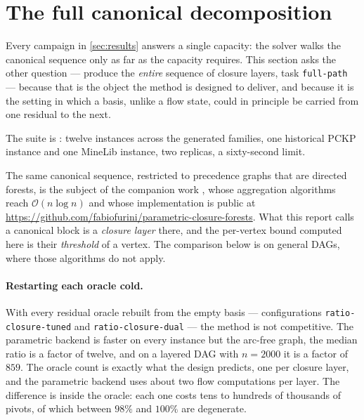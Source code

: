 \section{The full canonical decomposition}\label{sec:canonical}

Every campaign in \cref{sec:results} answers a single capacity: the solver walks
the canonical sequence only as far as the capacity requires. This section asks
the other question --- produce the \emph{entire} sequence of closure layers,
task \texttt{full-path} --- because that is the object the method is designed to
deliver, and because it is the setting in which a basis, unlike a flow state,
could in principle be carried from one residual to the next.

The suite is : twelve instances across
the generated families, one historical PCKP instance and one MineLib instance,
two replicas, a sixty-second limit.

The same canonical sequence, restricted to precedence graphs that are directed
forests, is the subject of the companion work \citep{DoseEtAl2026}, whose
aggregation algorithms reach $\mathcal{O}(n\log n)$ and whose implementation is
public at \url{https://github.com/fabiofurini/parametric-closure-forests}. What
this report calls a canonical block is a \emph{closure layer} there, and the
per-vertex bound computed here is their \emph{threshold} of a vertex. The
comparison below is on general DAGs, where those algorithms do not apply.



\paragraph{Restarting each oracle cold.} With every residual oracle rebuilt
from the empty basis --- configurations \texttt{ratio-closure-tuned} and
\texttt{ratio-closure-dual} --- the method is not competitive. The parametric
backend is faster on every instance but the arc-free graph, the median ratio is
a factor of twelve, and on a layered DAG with $n = 2000$ it is a factor of
$859$. The oracle count is exactly what the design predicts, one per closure
layer, and the parametric backend uses about two flow computations per layer.
The difference is inside the oracle: each one costs tens to hundreds of
thousands of pivots, of which between $98\%$ and $100\%$ are degenerate.

